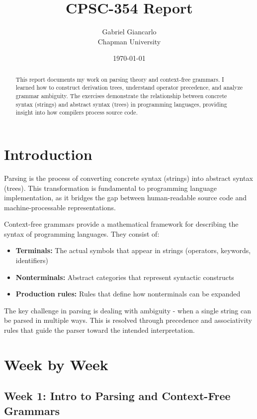 \documentclass{article}
\title{CPSC-354 Report}
\author{Gabriel Giancarlo \\ Chapman University}
\date{\today}
\theoremstyle{plain}
\theoremstyle{definition}
\theoremstyle{remark}
\begin{document}
\maketitle

\begin{abstract}
This report documents my work on parsing theory and context-free grammars. I learned how to construct derivation trees, understand operator precedence, and analyze grammar ambiguity. The exercises demonstrate the relationship between concrete syntax (strings) and abstract syntax (trees) in programming languages, providing insight into how compilers process source code.
\end{abstract}

\setcounter{tocdepth}{3}
\tableofcontents

\section{Introduction}\label{intro}

Parsing is the process of converting concrete syntax (strings) into abstract syntax (trees). This transformation is fundamental to programming language implementation, as it bridges the gap between human-readable source code and machine-processable representations.

Context-free grammars provide a mathematical framework for describing the syntax of programming languages. They consist of:
\begin{itemize}
\item \textbf{Terminals:} The actual symbols that appear in strings (operators, keywords, identifiers)
\item \textbf{Nonterminals:} Abstract categories that represent syntactic constructs
\item \textbf{Production rules:} Rules that define how nonterminals can be expanded
\end{itemize}

The key challenge in parsing is dealing with ambiguity - when a single string can be parsed in multiple ways. This is resolved through precedence and associativity rules that guide the parser toward the intended interpretation.

\section{Week by Week}\label{homework}

\subsection{Week 1: Intro to Parsing and Context-Free Grammars}
\end{document}
